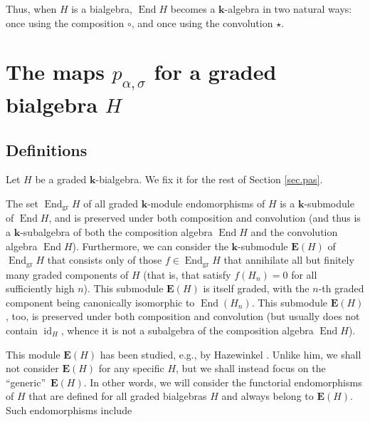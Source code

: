\documentclass[numbers=enddot,12pt,final,onecolumn,notitlepage]{scrartcl}%
\theoremstyle{definition}
\begin{document}
Thus, when $H$ is a bialgebra, $\operatorname*{End}H$ becomes a $\mathbf{k}%
$-algebra in two natural ways: once using the composition $\circ$, and once
using the convolution $\star$.


\section{\label{sec.pas}The maps $p_{\alpha,\sigma}$ for a graded bialgebra
$H$}

\subsection{Definitions}

Let $H$ be a graded $\mathbf{k}$-bialgebra. We fix it for the rest of Section
\ref{sec.pas}.

The set $\operatorname*{End}\nolimits_{\operatorname*{gr}}H$ of all graded
$\mathbf{k}$-module endomorphisms of $H$ is a $\mathbf{k}$-submodule of
$\operatorname*{End}H$, and is preserved under both composition and
convolution (and thus is a $\mathbf{k}$-subalgebra of both the composition
algebra $\operatorname*{End}H$ and the convolution algebra
$\operatorname*{End}H$). Furthermore, we can consider the $\mathbf{k}%
$-submodule $\mathbf{E}\left(  H\right)  $ of $\operatorname*{End}%
\nolimits_{\operatorname*{gr}}H$ that consists only of those $f\in
\operatorname*{End}\nolimits_{\operatorname*{gr}}H$ that annihilate all but
finitely many graded components of $H$ (that is, that satisfy $f\left(
H_{n}\right)  =0$ for all sufficiently high $n$). This submodule
$\mathbf{E}\left(  H\right)  $ is itself graded, with the $n$-th graded
component being canonically isomorphic to $\operatorname*{End}\left(
H_{n}\right)  $. This submodule $\mathbf{E}\left(  H\right)  $, too, is
preserved under both composition and convolution (but usually does not contain
$\operatorname*{id}\nolimits_{H}$, whence it is not a subalgebra of the
composition algebra $\operatorname*{End}H$).

This module $\mathbf{E}\left(  H\right)  $ has been studied, e.g., by
Hazewinkel \cite{Hazewi04}. Unlike him, we shall not consider $\mathbf{E}%
\left(  H\right)  $ for any specific $H$, but we shall instead focus on the
\textquotedblleft generic\textquotedblright\ $\mathbf{E}\left(  H\right)  $.
In other words, we will consider the functorial endomorphisms of $H$ that are
defined for all graded bialgebras $H$ and always belong to $\mathbf{E}\left(
H\right)  $. Such endomorphisms include
\end{document}
